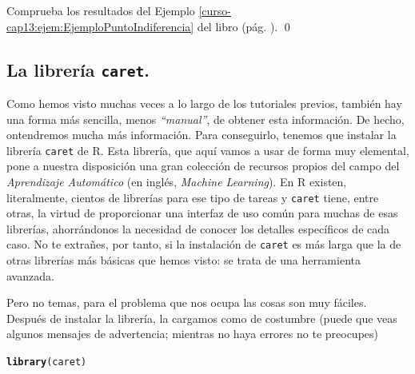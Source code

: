\documentclass[10pt,a4paper]{article}\usepackage[]{graphicx}\usepackage[]{color}
\makeatletter
\newcommand{\hlstd}[1]{\textcolor[rgb]{0.345,0.345,0.345}{#1}}%
\newcommand{\hlkwd}[1]{\textcolor[rgb]{0.737,0.353,0.396}{\textbf{#1}}}%
\newenvironment{kframe}{%
 \def\at@end@of@kframe{}%
 \ifinner\ifhmode%
  \def\at@end@of@kframe{\end{minipage}}%
  \begin{minipage}{\columnwidth}%
 \fi\fi%
 \def\FrameCommand##1{\hskip\@totalleftmargin \hskip-\fboxsep
 \colorbox{shadecolor}{##1}\hskip-\fboxsep
     \hskip-\linewidth \hskip-\@totalleftmargin \hskip\columnwidth}%
 \MakeFramed {\advance\hsize-\width
   \@totalleftmargin\z@ \linewidth\hsize
   \@setminipage}}%
 {\par\unskip\endMakeFramed%
 \at@end@of@kframe}
\newenvironment{knitrout}{}{} %
\makeatother
\begin{document}
\begin{ejercicio}
\label{tut13:ejercicio09}
Comprueba los resultados del Ejemplo \ref{curso-cap13:ejem:EjemploPuntoIndiferencia} del libro (pág. \pageref{curso-cap13:ejem:EjemploPuntoIndiferencia}).
\qed
\end{ejercicio}


\subsection{La librería {\tt caret}.}
\label{tut13:subsec:LibreriaCaret}

Como hemos visto muchas veces a lo largo de los tutoriales previos, también hay una forma más sencilla, menos {\em ``manual''},  de obtener esta información. De hecho, ontendremos mucha más información. Para conseguirlo, tenemos que instalar la librería {\tt caret} de R. Esta librería, que aquí vamos a usar de forma muy elemental, pone a nuestra disposición una gran colección de recursos propios del campo del {\em Aprendizaje Automático} (en inglés, {\em Machine Learning}). En R existen, literalmente, cientos de librerías para ese tipo de tareas y {\tt caret} tiene, entre otras, la virtud de proporcionar una interfaz de uso común para muchas de esas librerías, ahorrándonos la necesidad de conocer los detalles específicos de cada caso. No te extrañes, por tanto, si la instalación de {\tt caret} es más larga que la de otras librerías más básicas que hemos visto: se trata de una herramienta avanzada.

Pero no temas, para el problema que nos ocupa las cosas son muy fáciles. Después de instalar la librería, la cargamos como de costumbre  (puede que veas algunos mensajes de advertencia; mientras no haya errores no te preocupes)

\begin{knitrout}
\color{fgcolor}\begin{kframe}
\begin{alltt}
\hlkwd{library}\hlstd{(caret)}
\end{alltt}
\end{kframe}
\end{knitrout}
\end{document}
